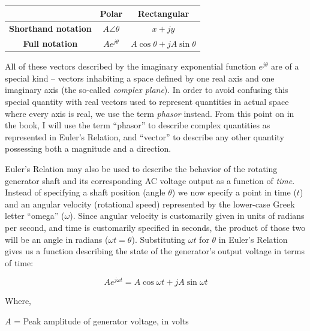 \begin{center}
\begin{tabular}{| c | c | c |}
\hline 
 & \textbf{Polar} & \textbf{Rectangular} \\[3pt] \hline
\textbf{Shorthand notation} & $A \angle \theta$ & $x + jy$ \\[3pt] \hline 
\textbf{Full notation} & $Ae^{j \theta}$ & $A \cos \theta + j A \sin \theta$ \\[3pt] \hline
\end{tabular}
\end{center}

\vskip 10pt

All of these vectors described by the imaginary exponential function $e^{j \theta}$ are of a special kind -- vectors inhabiting a space defined by one real axis and one imaginary axis (the so-called \textit{complex plane}).  In order to avoid confusing this special quantity with real vectors used to represent quantities in actual space where every axis is real, we use the term \textit{phasor} instead.  From this point on in the book, I will use the term ``phasor'' to describe complex quantities as represented in Euler's Relation, and ``vector'' to describe any other quantity possessing both a magnitude and a direction.    

\vskip 10pt

\filbreak

Euler's Relation may also be used to describe the behavior of the rotating generator shaft and its corresponding AC voltage output as a function of \textit{time}.  Instead of specifying a shaft position (angle $\theta$) we now specify a point in time ($t$) and an angular velocity (rotational speed) represented by the lower-case Greek letter ``omega'' ($\omega$).  Since angular velocity is customarily given in units of radians per second, and time is customarily specified in seconds, the product of those two will be an angle in radians ($\omega t = \theta$).  Substituting $\omega t$ for $\theta$ in Euler's Relation gives us a function describing the state of the generator's output voltage in terms of time:

$$Ae^{j \omega t} = A \cos \omega t + j A \sin \omega t$$

\noindent
Where,

$A$ = Peak amplitude of generator voltage, in volts

